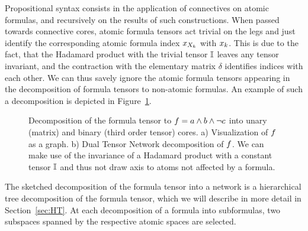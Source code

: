 


Propositional syntax consists in the application of connectives on atomic formulas, and recursively on the results of such constructions.
When passed towards connective cores, atomic formula tensors act trivial on the legs and just identify the corresponding atomic formula index $x_{X_{k}}$ with $x_{k}$.
This is due to the fact, that the Hadamard product with the trivial tensor $\mathbb{I}$ leaves any tensor invariant, and the contraction with the elementary matrix $\delta$ identifies indices with each other.
We can thus savely ignore the atomic formula tensors appearing in the decomposition of formula tensors to non-atomic formulas.
An example of such a decomposition is depicted in Figure~\ref{fig:FTDecomposition}.





\begin{figure}[h]
\begin{center}
	
\end{center}
\caption{Decomposition of the formula tensor to $f = a \land b \land \lnot c$ into unary (matrix) and binary (third order tensor) cores.
	a) Visualization of $f$ as a graph. %
	b) Dual Tensor Network decomposition of $f$.
	We can make use of the invariance of a Hadamard product with a constant tensor $\mathbb{I}$ and thus not draw axis to atoms not affected by a formula.}
\label{fig:FTDecomposition}
\end{figure}





\begin{remark}\label{rem:HTDecomFT}
	The sketched decomposition of the formula tensor into a network is a hierarchical tree decomposition of the formula tensor, which we will describe in more detail in Section~\ref{sec:HT}.
	At each decomposition of a formula into subformulas, two subspaces spanned by the respective atomic spaces are selected. 
\end{remark}


